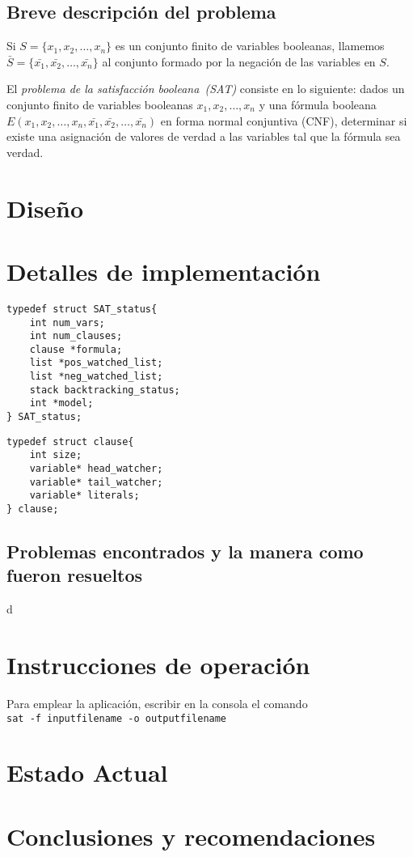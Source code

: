 \documentclass[12pt,lettersize]{article}
\begin{document}
\subsection{Breve descripción del problema} 
Si $S=\{x_1,x_2,\ldots,x_n\}$ es un conjunto finito de variables booleanas,
llamemos $\bar{S}=\{\bar{x_1},\bar{x_2},\ldots,\bar{x_n}\}$ al conjunto formado
por la negación de las variables en $S$. 


El \emph{problema de la satisfacción booleana~(SAT)} consiste en lo siguiente:
dados un conjunto finito de variables booleanas $x_1,x_2,\ldots,x_n$ y una
fórmula booleana $E(x_1,x_2,\ldots,x_n,\bar{x_1},\bar{x_2},\ldots,\bar{x_n})$ en
forma normal conjuntiva (CNF), determinar si existe una asignación de valores de
verdad a las variables tal que la fórmula sea verdad.

\section{Diseño}

\section{Detalles de implementación}

\begin{lstlisting}
typedef struct SAT_status{    
    int num_vars;
    int num_clauses;
    clause *formula;
    list *pos_watched_list;
    list *neg_watched_list;
    stack backtracking_status;
    int *model;                     
} SAT_status;
\end{lstlisting}


\begin{lstlisting}
typedef struct clause{
    int size;
    variable* head_watcher;
    variable* tail_watcher;
    variable* literals;
} clause;
\end{lstlisting}


\subsection{Problemas encontrados y la manera como fueron resueltos}


\begin{texttt}
d
\end{texttt}

\section{Instrucciones de operación}
Para emplear la aplicación, escribir en la consola el comando
\\ \texttt{sat -f inputfilename -o outputfilename}
\section{Estado Actual}

\section{Conclusiones y recomendaciones}
\end{document}
